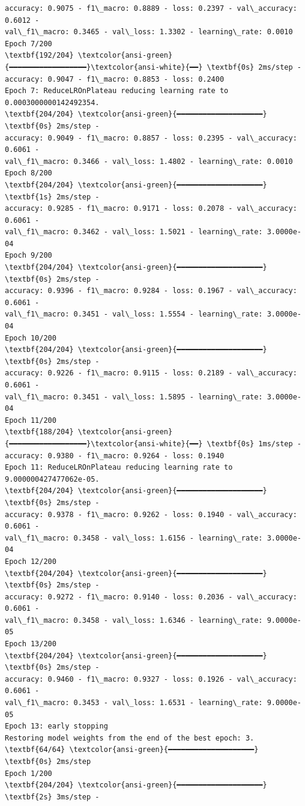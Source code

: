 \documentclass[11pt]{article}
\begin{document}
\begin{Verbatim}[commandchars=\\\{\}]
accuracy: 0.9075 - f1\_macro: 0.8889 - loss: 0.2397 - val\_accuracy: 0.6012 -
val\_f1\_macro: 0.3465 - val\_loss: 1.3302 - learning\_rate: 0.0010
Epoch 7/200
\textbf{192/204} \textcolor{ansi-green}{━━━━━━━━━━━━━━━━━━}\textcolor{ansi-white}{━━} \textbf{0s} 2ms/step -
accuracy: 0.9047 - f1\_macro: 0.8853 - loss: 0.2400
Epoch 7: ReduceLROnPlateau reducing learning rate to 0.0003000000142492354.
\textbf{204/204} \textcolor{ansi-green}{━━━━━━━━━━━━━━━━━━━━} \textbf{0s} 2ms/step -
accuracy: 0.9049 - f1\_macro: 0.8857 - loss: 0.2395 - val\_accuracy: 0.6061 -
val\_f1\_macro: 0.3466 - val\_loss: 1.4802 - learning\_rate: 0.0010
Epoch 8/200
\textbf{204/204} \textcolor{ansi-green}{━━━━━━━━━━━━━━━━━━━━} \textbf{1s} 2ms/step -
accuracy: 0.9285 - f1\_macro: 0.9171 - loss: 0.2078 - val\_accuracy: 0.6061 -
val\_f1\_macro: 0.3462 - val\_loss: 1.5021 - learning\_rate: 3.0000e-04
Epoch 9/200
\textbf{204/204} \textcolor{ansi-green}{━━━━━━━━━━━━━━━━━━━━} \textbf{0s} 2ms/step -
accuracy: 0.9396 - f1\_macro: 0.9284 - loss: 0.1967 - val\_accuracy: 0.6061 -
val\_f1\_macro: 0.3451 - val\_loss: 1.5554 - learning\_rate: 3.0000e-04
Epoch 10/200
\textbf{204/204} \textcolor{ansi-green}{━━━━━━━━━━━━━━━━━━━━} \textbf{0s} 2ms/step -
accuracy: 0.9226 - f1\_macro: 0.9115 - loss: 0.2189 - val\_accuracy: 0.6061 -
val\_f1\_macro: 0.3451 - val\_loss: 1.5895 - learning\_rate: 3.0000e-04
Epoch 11/200
\textbf{188/204} \textcolor{ansi-green}{━━━━━━━━━━━━━━━━━━}\textcolor{ansi-white}{━━} \textbf{0s} 1ms/step -
accuracy: 0.9380 - f1\_macro: 0.9264 - loss: 0.1940
Epoch 11: ReduceLROnPlateau reducing learning rate to 9.000000427477062e-05.
\textbf{204/204} \textcolor{ansi-green}{━━━━━━━━━━━━━━━━━━━━} \textbf{0s} 2ms/step -
accuracy: 0.9378 - f1\_macro: 0.9262 - loss: 0.1940 - val\_accuracy: 0.6061 -
val\_f1\_macro: 0.3458 - val\_loss: 1.6156 - learning\_rate: 3.0000e-04
Epoch 12/200
\textbf{204/204} \textcolor{ansi-green}{━━━━━━━━━━━━━━━━━━━━} \textbf{0s} 2ms/step -
accuracy: 0.9272 - f1\_macro: 0.9140 - loss: 0.2036 - val\_accuracy: 0.6061 -
val\_f1\_macro: 0.3458 - val\_loss: 1.6346 - learning\_rate: 9.0000e-05
Epoch 13/200
\textbf{204/204} \textcolor{ansi-green}{━━━━━━━━━━━━━━━━━━━━} \textbf{0s} 2ms/step -
accuracy: 0.9460 - f1\_macro: 0.9327 - loss: 0.1926 - val\_accuracy: 0.6061 -
val\_f1\_macro: 0.3453 - val\_loss: 1.6531 - learning\_rate: 9.0000e-05
Epoch 13: early stopping
Restoring model weights from the end of the best epoch: 3.
\textbf{64/64} \textcolor{ansi-green}{━━━━━━━━━━━━━━━━━━━━} \textbf{0s} 2ms/step
Epoch 1/200
\textbf{204/204} \textcolor{ansi-green}{━━━━━━━━━━━━━━━━━━━━} \textbf{2s} 3ms/step -

\end{Verbatim}
\end{document}
